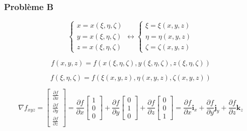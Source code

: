 \documentclass
[
a4paper,                      %
twoside,					  %
12pt,                         %
abstract,		      %
fleqn,                        %
]
{scrartcl} %
\begin{document}
\subsubsection{Probl\`eme B}

\begin{equation}
\begin{cases}
x=x\left(\xi,\eta,\zeta\right)\\
y=x\left(\xi,\eta,\zeta\right)\\
z=x\left(\xi,\eta,\zeta\right)
\end{cases}\longleftrightarrow\begin{cases}
\xi=\xi\left(x,y,z\right)\\
\eta=\eta\left(x,y,z\right)\\
\zeta=\zeta\left(x,y,z\right)
\end{cases}
\end{equation}

\begin{equation}
f\left(x,y,z\right)=f\left(x\left(\xi,\eta,\zeta\right),y\left(\xi,\eta,\zeta\right),z\left(\xi,\eta,\zeta\right)\right)
\end{equation}

\begin{equation}
f\left(\xi,\eta,\zeta\right)=f\left(\xi\left(x,y,z\right),\eta\left(x,y,z\right),\zeta\left(x,y,z\right)\right)
\end{equation}

\begin{equation}
\nabla f_{xyz}=\begin{bmatrix}
\frac{\partial f}{\partial x}\\[5pt]
\frac{\partial f}{\partial y}\\[5pt]
\frac{\partial f}{\partial z}
\end{bmatrix}=\frac{\partial f}{\partial x}\begin{bmatrix}
1\\[5pt]
0\\[5pt]
0
\end{bmatrix}+\frac{\partial f}{\partial y}\begin{bmatrix}
0\\[5pt]
1\\[5pt]
0
\end{bmatrix}+\frac{\partial f}{\partial z}\begin{bmatrix}
0\\[5pt]
0\\[5pt]
1
\end{bmatrix}=\frac{\partial f}{\partial x}\mathbf{i}_{x}+\frac{\partial f}{\partial y}\mathbf{j}_{y}+\frac{\partial f}{\partial z}\mathbf{k}_{z}
\end{equation}
\end{document}
